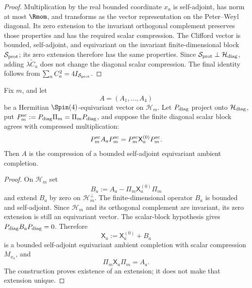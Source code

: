 \documentclass[12pt,a4paper]{article}
\begin{document}
\begin{proof}
Multiplication by the real bounded coordinate \(x_a\) is self-adjoint, has
norm at most \(\Rmom\), and transforms as the vector representation on the
Peter--Weyl diagonal.  Its zero extension to the invariant orthogonal
complement preserves those properties and has the required scalar
compression.  The Clifford vector is bounded, self-adjoint, and equivariant
on the invariant finite-dimensional block \(\mathcal S_{\rm prot}\); its zero extension
therefore has the same properties.  Since
\(\mathcal S_{\rm prot}\perp\mathcal H_{\rm diag}\), adding
\(\lambda\widetilde C_a\) does not change the diagonal scalar compression.
The final identity follows from
\(\sum_a C_a^2=4I_{\mathcal S_{\rm prot}}\).
\end{proof}

\begin{proposition}
\label{p2:prop:finite-action-ambient-extension}
Fix \(m\), and let
\[
        A=(A_1,\ldots,A_4)
\]
be a Hermitian \(\Spin(4)\)-equivariant vector on \(\mathcal H_m\).  Let
\(P_{\rm diag}\) project onto \(\mathcal H_{\rm diag}\), put
\(P_m^{\rm sc}:=P_{\rm diag}\Pi_m=\Pi_mP_{\rm diag}\), and suppose the
finite diagonal scalar block agrees with compressed multiplication:
\[
P_m^{\rm sc} A_aP_m^{\rm sc}
=
P_m^{\rm sc}\mathsf X_a^{(0)}P_m^{\rm sc}.
\]
Then \(A\) is the compression of a bounded self-adjoint equivariant ambient
completion.
\end{proposition}

\begin{proof}
On \(\mathcal H_m\) set
\[
        B_a:=A_a-\Pi_m\mathsf X_a^{(0)}\Pi_m
\]
and extend \(B_a\) by zero on \(\mathcal H_m^\perp\).  The finite-dimensional
operator \(B_a\) is bounded and self-adjoint.  Since \(\mathcal H_m\) and its
orthogonal complement are invariant, its zero extension is still an
equivariant vector.  The scalar-block hypothesis gives
\(P_{\rm diag}B_aP_{\rm diag}=0\).  Therefore
\[
        \mathsf X_a:=\mathsf X_a^{(0)}+B_a
\]
is a bounded self-adjoint equivariant ambient completion with scalar
compression \(M_{x_a}\), and
\[
        \Pi_m\mathsf X_a\Pi_m=A_a.
\]
The construction proves existence of an extension; it does not make that
extension unique.
\end{proof}
\end{document}
